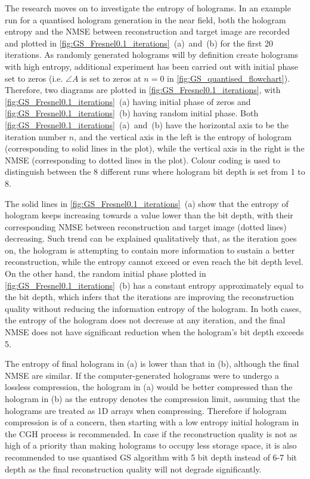 	The research moves on to investigate the entropy of holograms. In an example run for a quantised hologram generation in the near field, both the hologram entropy and the NMSE between reconstruction and target image are recorded and plotted in \cref{fig:GS_Fresnel0.1_iterations}~(a)~and~(b) for the first 20 iterations. As randomly generated holograms will by definition create holograms with high entropy, additional experiment has been carried out with initial phase set to zeros (i.e. $\angle A$ is set to zeros at $n=0$ in \cref{fig:GS_quantised_flowchart}). Therefore, two diagrams are plotted in \cref{fig:GS_Fresnel0.1_iterations}, with \cref{fig:GS_Fresnel0.1_iterations}~(a) having initial phase of zeros and \cref{fig:GS_Fresnel0.1_iterations}~(b) having random initial phase. Both \cref{fig:GS_Fresnel0.1_iterations}~(a)~and~(b) have the horizontal axis to be the iteration number $n$, and the vertical axis in the left is the entropy of hologram (corresponding to solid lines in the plot), while the vertical axis in the right is the NMSE (corresponding to dotted lines in the plot). Colour coding is used to distinguish between the 8 different runs where hologram bit depth is set from 1 to 8.

	The solid lines in \cref{fig:GS_Fresnel0.1_iterations}~(a) show that the entropy of hologram keeps increasing towards a value lower than the bit depth, with their corresponding NMSE between reconstruction and target image (dotted lines) decreasing. Such trend can be explained qualitatively that, as the iteration goes on, the hologram is attempting to contain more information to sustain a better reconstruction, while the entropy cannot exceed or even reach the bit depth level. On the other hand, the random initial phase plotted in \cref{fig:GS_Fresnel0.1_iterations}~(b) has a constant entropy approximately equal to the bit depth, which infers that the iterations are improving the reconstruction quality without reducing the information entropy of the hologram. In both cases, the entropy of the hologram does not decrease at any iteration, and the final NMSE does not have significant reduction when the hologram's bit depth exceeds 5.

	The entropy of final hologram in (a) is lower than that in (b), although the final NMSE are similar. If the computer-generated holograms were to undergo a lossless compression, the hologram in (a) would be better compressed than the hologram in (b) as the entropy denotes the compression limit, assuming that the holograms are treated as 1D arrays when compressing. Therefore if hologram compression is of a concern, then starting with a low entropy initial hologram in the CGH process is recommended. In case if the reconstruction quality is not as high of a priority than making holograms to occupy less storage space, it is also recommended to use quantised GS algorithm with 5 bit depth instead of 6-7 bit depth as the final reconstruction quality will not degrade significantly.



